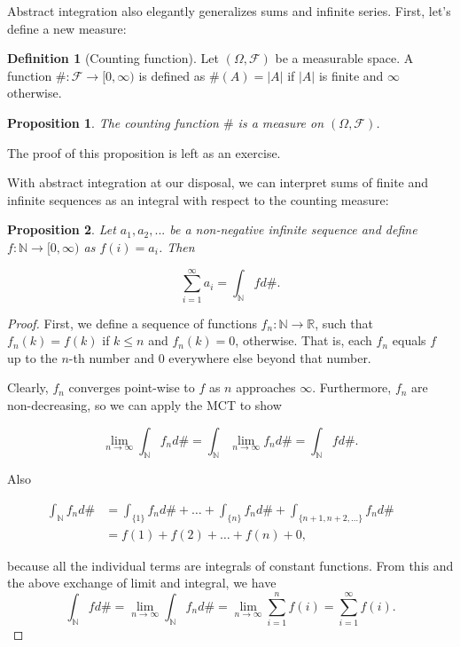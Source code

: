 \documentclass{book}
\theoremstyle{plain}%
\newtheorem{proposition}{Proposition}[section]
\theoremstyle{definition}
\newtheorem{definition}{Definition}[section]
\newlength{\arrow}
\begin{document}
Abstract integration also elegantly generalizes sums and infinite series. First, let's define a new measure:

\begin{definition}[Counting function] Let $(\Omega, \mathcal{F})$ be a measurable space. A function $\#:\mathcal{F} \longrightarrow [0,\infty)$ is defined as $\#(A) = |A|$ if $|A|$ is finite and $\infty$ otherwise.
\end{definition}

\begin{proposition}
The counting function $\#$ is a measure on $(\Omega, \mathcal{F})$.\label{prop:counting}
\end{proposition}

The proof of this proposition is left as an exercise.

With abstract integration at our disposal, we can interpret sums of finite and infinite sequences as an integral with respect to the counting measure:

\begin{proposition} Let $a_1, a_2, ...$ be a non-negative infinite sequence and define $f: \mathbb{N} \longrightarrow [0, \infty)$ as $f(i) = a_i$. Then

$$\sum_{i=1}^\infty a_i = \int_\mathbb{N} f d\#.$$
\end{proposition}

\begin{proof} First, we define a sequence of functions $f_n: \mathbb{N} \longrightarrow \mathbb{R}$, such that $f_n(k) = f(k)$ if $k \leq n$ and $f_n(k) = 0$, otherwise. That is, each $f_n$ equals $f$ up to the $n$-th number and 0 everywhere else beyond that number.

Clearly, $f_n$ converges point-wise to $f$ as $n$ approaches $\infty$. Furthermore, $f_n$ are non-decreasing, so we can apply the MCT to show

$$\lim_{n \rightarrow \infty} \int_\mathbb{N} f_n d\# = \int_\mathbb{N} \lim_{n \rightarrow \infty} f_n d\# = \int_\mathbb{N} f d\#.$$

Also

\begin{align*}
    \int_\mathbb{N} f_n d\# &= \int_{\{1\}} f_n d\# + \dots + \int_{\{n\}} f_n d\# + \int_{\{n+1, n+2, \dots\}} f_n d\# && \text{}\\
    &= f(1) + f(2) + \dots + f(n) + 0, &&
\end{align*}

because all the individual terms are integrals of constant functions. From this and the above exchange of limit and integral, we have $$\int_\mathbb{N} f d\# =\lim_{n \rightarrow \infty} \int_\mathbb{N} f_n d\# = \lim_{n \rightarrow \infty} \sum_{i=1}^n f(i) = \sum_{i=1}^\infty f(i).$$

\end{proof}
\end{document}
